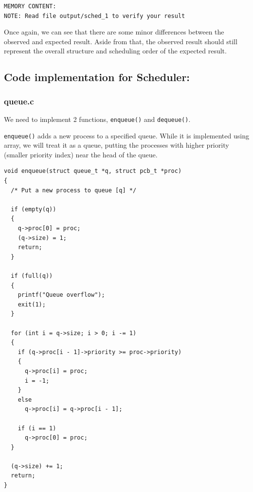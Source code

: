 \documentclass[a4paper]{article}
\numberwithin{equation}{section}
\begin{document}
\begin{mdframed}[leftline=false,rightline=false,backgroundcolor=teal!10,nobreak=false]
\begin{verbatim}
MEMORY CONTENT:
NOTE: Read file output/sched_1 to verify your result
  \end{verbatim}
\end{mdframed}

Once again, we can see that there are some minor differences between the observed and expected result.
Aside from that, the observed result should still represent the overall structure and scheduling order of the expected result.

\subsection{Code implementation for Scheduler:}
\subsubsection{queue.c}
We need to implement 2 functions, \texttt{enqueue()} and \texttt{dequeue()}.

\texttt{enqueue()} adds a new process to a specified queue.
While it is implemented using array, we will treat it as a queue, putting the processes with higher priority (smaller priority index) near the head of the queue.
\begin{mdframed}[leftline=false,rightline=false,backgroundcolor=magenta!10,nobreak=false]
  \begin{verbatim}
void enqueue(struct queue_t *q, struct pcb_t *proc)
{
  /* Put a new process to queue [q] */

  if (empty(q))
  {
    q->proc[0] = proc;
    (q->size) = 1;
    return;
  }

  if (full(q))
  {
    printf("Queue overflow");
    exit(1);
  }

  for (int i = q->size; i > 0; i -= 1)
  {
    if (q->proc[i - 1]->priority >= proc->priority)
    {
      q->proc[i] = proc;
      i = -1;
    }
    else
      q->proc[i] = q->proc[i - 1];

    if (i == 1)
      q->proc[0] = proc;
  }

  (q->size) += 1;
  return;
}
  \end{verbatim}
\end{mdframed}
\end{document}
